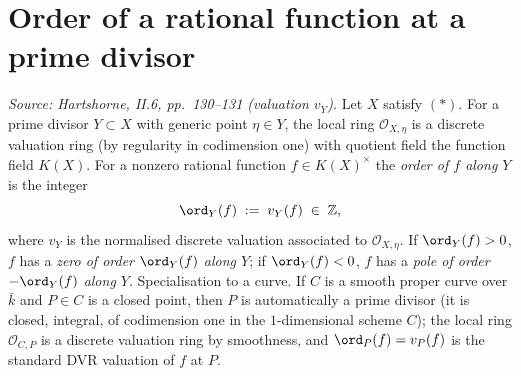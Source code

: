 \section{Order of a rational function at a prime divisor}
\begin{definition}
  \label{def:order_at_point}

  \textit{Source: Hartshorne, II.6, pp.~130--131 (valuation \(v_Y\)).}
  Let \(X\) satisfy \((*)\). For a prime divisor \(Y \subset X\) with generic
  point \(\eta \in Y\), the local ring \(\mathcal O_{X, \eta}\) is a discrete
  valuation ring (by regularity in codimension one) with quotient field the
  function field \(K(X)\). For a nonzero rational function \(f \in K(X)^{\times}\)
  the \emph{order of \(f\) along \(Y\)} is the integer
  \[
    \ord_Y(f) \;:=\; v_Y(f) \;\in\; \mathbb Z,
  \]
  where \(v_Y\) is the normalised discrete valuation associated to
  \(\mathcal O_{X, \eta}\). If \(\ord_Y(f) > 0\), \(f\) has a \emph{zero of
  order \(\ord_Y(f)\) along \(Y\)}; if \(\ord_Y(f) < 0\), \(f\) has a \emph{pole
  of order \(-\ord_Y(f)\) along \(Y\)}.
  Specialisation to a curve. If \(C\) is a smooth proper curve over \(\bar k\)
  and \(P \in C\) is a closed point, then \(P\) is automatically a prime
  divisor (it is closed, integral, of codimension one in the \(1\)-dimensional
  scheme \(C\)); the local ring \(\mathcal O_{C, P}\) is a discrete valuation
  ring by smoothness, and \(\ord_P(f) = v_P(f)\) is the standard DVR
  valuation of \(f\) at \(P\).
\end{definition}
